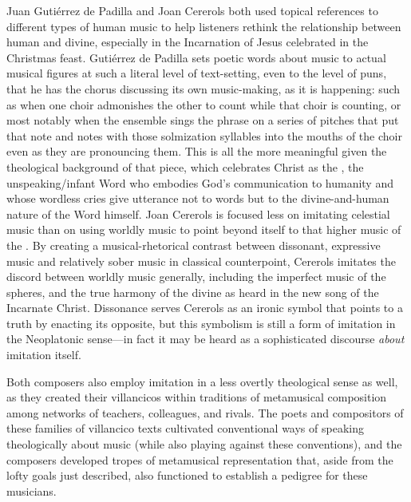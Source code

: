 Juan Gutiérrez de Padilla and Joan Cererols both used topical references to
different types of human music to help listeners rethink the relationship
between human and divine, especially in the Incarnation of Jesus celebrated in
the Christmas feast.
Gutiérrez de Padilla sets poetic words about music to actual musical figures at
such a literal level of text-setting, even to the level of puns, that he has
the chorus discussing its own music-making, as it is happening: such as when
one choir admonishes the other to count while that choir is counting, or most
notably when the ensemble sings the phrase  on a series of
pitches that put that note and notes with those solmization syllables into the
mouths of the choir even as they are pronouncing them.
This is all the more meaningful given the theological background of that piece,
which celebrates Christ as the , the unspeaking/infant Word
who embodies God's communication to humanity and whose wordless cries give
utterance not to words but to the divine-and-human nature of the Word himself.
Joan Cererols is focused less on imitating celestial music than on using
worldly music to point beyond itself to that higher music of the .
By creating a musical-rhetorical contrast between dissonant, expressive music
and relatively sober music in classical counterpoint, Cererols imitates the
discord between worldly music generally, including the imperfect music of the
spheres, and the true harmony of the divine as heard in the new song of the
Incarnate Christ.
Dissonance serves Cererols as an ironic symbol that points to a truth by
enacting its opposite, but this symbolism is still a form of imitation in the
Neoplatonic sense---in fact it may be heard as a sophisticated discourse
\emph{about} imitation itself.

Both composers also employ imitation in a less overtly theological sense as
well, as they created their villancicos within traditions of metamusical
composition among networks of teachers, colleagues, and rivals. 
The poets and compositors of these families of villancico texts cultivated
conventional ways of speaking theologically about music (while also playing
against these conventions), and the composers developed tropes of metamusical
representation that, aside from the lofty goals just described, also functioned
to establish a pedigree for these musicians.

